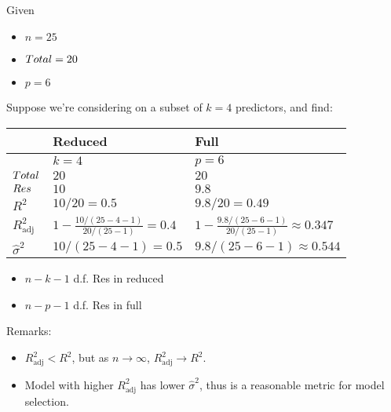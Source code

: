 \begin{Example}{}{}
    Given
    \begin{itemize}
        \item $ n=25 $
        \item $ \relax{Total}=20 $
        \item $ p=6 $
    \end{itemize}
    Suppose
    we're considering on a subset of $ k=4 $
    predictors, and find:

    \begin{center}
        \begin{tabularx}{0.8\linewidth}{@{}YYY@{}}
                                 & Reduced                                 & Full                                              \\
            \midrule
                                 & $ k=4 $                                 & $ p=6 $                                           \\
            $ \relax{Total} $       & $ 20 $                                  & $ 20 $                                            \\
            $ \relax{Res} $         & $ 10 $                                  & $ 9.8 $                                           \\
            \midrule
            $ R^2 $              & $ 10/20=0.5 $                           & $ 9.8/20=0.49 $                                   \\
            $ R^2_{\text{adj}} $ & $ 1-\frac{10/(25-4-1)}{20/(25-1)}=0.4 $ & $ 1-\frac{9.8/(25-6-1)}{20/(25-1)}\approx 0.347 $ \\
            $ \hat{\sigma}^2 $   & $ 10/(25-4-1)=0.5 $                     & $ 9.8/(25-6-1)\approx 0.544 $
        \end{tabularx}
    \end{center}
    \begin{itemize}
        \item $ n-k-1 $ d.f. Res in reduced
        \item $ n-p-1 $ d.f. Res in full
    \end{itemize}
    Remarks:
    \begin{itemize}
        \item $ R^2_{\text{adj}}<R^2 $, but as $ n\to\infty $,
              $ R^2_{\text{adj}}\to R^2 $.
        \item Model with higher $ R^2_{\text{adj}} $
              has lower $ \hat{\sigma}^2 $,
              thus is a reasonable metric for model selection.
    \end{itemize}
\end{Example}
